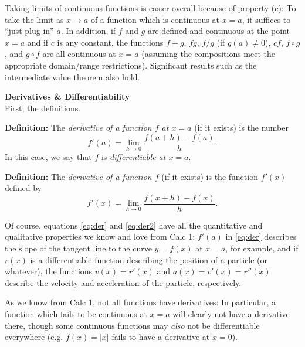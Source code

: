 \documentclass[12pt]{article}
\newcommand{\sectitle}[1]{\vspace{7.5mm}\noindent\textbf{\Large{#1}}\\[3mm]}
\begin{document}
	Taking limits of continuous functions is easier overall because of property (c): To take the limit as $x\to a$ of a function which is continuous at $x=a$, it suffices to ``just plug in'' $a$. In addition, if $f$ and $g$ are defined and continuous at the point $x=a$ and if $c$ is any constant, the functions $f\pm g$, $fg$, $f/g$ (if $g(a)\neq 0$), $cf$, $f\circ g$, and $g\circ f$ are all continuous at $x=a$ (assuming the compositions meet the appropriate domain/range restrictions). Significant results such as the intermediate value theorem also hold.

	\sectitle{Derivatives \& Differentiability}
	First, the definitions.\vspace{6mm}
	
	\noindent\textbf{Definition:} The \textit{derivative of a function $f$ at $x=a$} (if it exists) is the number
	\begin{equation}
		\label{eq:der}
		f'(a)=\lim_{h\to 0}\frac{f(a+h)-f(a)}{h}.
	\end{equation}
	In this case, we say that $f$ is \textit{differentiable at $x=a$}.\vspace{3mm}
	
	\vspace{6mm}
	
	\noindent\textbf{Definition:} The \textit{derivative of a function $f$} (if it exists) is the function $f'(x)$ defined by
	\begin{equation}
		\label{eq:der2}
		f'(x)=\lim_{h\to 0}\frac{f(x+h)-f(x)}{h}.
	\end{equation}

	Of course, equations \eqref{eq:der} and \eqref{eq:der2} have all the quantitative and qualitative properties we know and love from Calc 1: $f'(a)$ in \eqref{eq:der} describes the slope of the tangent line to the curve $y=f(x)$ at $x=a$, for example, and if $r(x)$ is a differentiable function describing the position of a particle (or whatever), the functions $v(x)=r'(x)$ and $a(x)=v'(x)=r''(x)$ describe the velocity and acceleration of the particle, respectively.
	
	As we know from Calc 1, not all functions have derivatives: In particular, a function which fails to be continuous at $x=a$ will clearly not have a derivative there, though some continuous functions may \textit{also} not be differentiable everywhere (e.g. $f(x)=|x|$ fails to have a derivative at $x=0$). 
	
\end{document}
